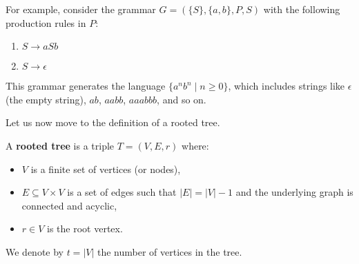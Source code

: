 \begin{example}
    For example, consider the grammar $G = (\{S\}, \{a, b\}, P, S)$ with the following production rules in $P$:
    \begin{enumerate}
        \item $S \rightarrow aSb$
        \item $S \rightarrow \epsilon$
    \end{enumerate}
    This grammar generates the language $\{a^n b^n \mid n \geq 0\}$, which includes strings like $\epsilon$ (the empty string), $ab$, $aabb$, $aaabbb$, and so on.
\end{example}

Let us now move to the definition of a rooted tree.
\begin{definition}[Tree] \label{def:rooted_tree}
    A \textbf{rooted tree} is a triple $T = (V, E, r)$ where:
    \begin{itemize}
        \item $V$ is a finite set of vertices (or nodes),
        \item $E\subseteq V \times V$ is a set of edges such that $|E| = |V|-1$ and the underlying graph is connected and acyclic,
        \item $r\in V$ is the root vertex.
    \end{itemize}
\end{definition}

We denote by $t = |V|$ the number of vertices in the tree.

